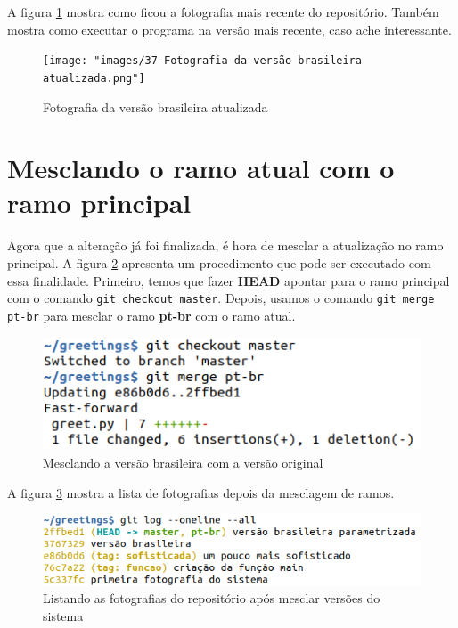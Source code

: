 \documentclass[a4paper]{book}
\begin{document}
A figura \ref{fig:37} mostra como ficou a fotografia
mais recente do repositório.
Também mostra como executar o programa na versão
mais recente, caso ache interessante.

\begin{figure}[ht]
\caption{Fotografia da versão brasileira atualizada}
\label{fig:37}
\centering
\texttt{[image: "images/37-Fotografia da versão brasileira atualizada.png"]}
\end{figure}

\section{Mesclando o ramo atual com o ramo principal}

Agora que a alteração já foi finalizada, é hora de 
mesclar a atualização no ramo principal.
A figura \ref{fig:39} apresenta um procedimento que pode
ser executado com essa finalidade.
Primeiro, temos que fazer \textbf{HEAD} apontar
para o ramo principal com o comando 
\texttt{git checkout master}.
Depois, usamos o comando \texttt{git merge pt-br}
para mesclar o ramo \textbf{pt-br} com o ramo atual.

\begin{figure}[ht]
\caption{Mesclando a versão brasileira com a versão original}
\label{fig:39}
\centering
\includegraphics[scale=0.6]{"images/39-Mesclando a versão brasileira com a versão original.png"}
\end{figure}

A figura \ref{fig:40} mostra a lista de fotografias
depois da mesclagem de ramos.

\begin{figure}[ht]
\caption{Listando as fotografias do repositório após mesclar versões do sistema}
\label{fig:40}
\centering
\includegraphics[scale=0.6]{"images/40-Listando as fotografias do repositório após mesclar versões do sistema.png"}
\end{figure}
\end{document}
